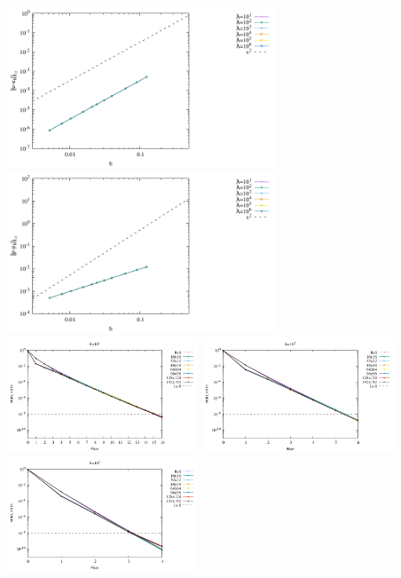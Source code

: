 \begin{center}
\includegraphics[width=8cm]{python_codes/fieldstone_161/results/bench1/iterations/errorsV.pdf}
\includegraphics[width=8cm]{python_codes/fieldstone_161/results/bench1/iterations/errorsP.pdf}\\
\includegraphics[width=5.7cm]{python_codes/fieldstone_161/results/bench1/iterations/conv1.pdf}
\includegraphics[width=5.7cm]{python_codes/fieldstone_161/results/bench1/iterations/conv2.pdf}
\includegraphics[width=5.7cm]{python_codes/fieldstone_161/results/bench1/iterations/conv3.pdf}\\

\end{center}

